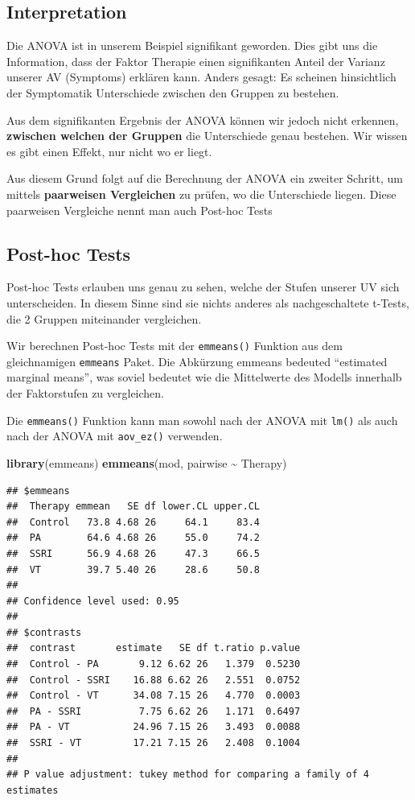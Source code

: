 \documentclass[
]{book}
\newenvironment{Shaded}{\begin{snugshade}}{\end{snugshade}}
\newcommand{\FunctionTok}[1]{\textcolor[rgb]{0.13,0.29,0.53}{\textbf{#1}}}
\newcommand{\NormalTok}[1]{#1}
\newcommand{\SpecialCharTok}[1]{\textcolor[rgb]{0.81,0.36,0.00}{\textbf{#1}}}
\begin{document}
\subsection{Interpretation}\label{interpretation}

Die ANOVA ist in unserem Beispiel signifikant geworden. Dies gibt uns die Information, dass der Faktor Therapie einen signifikanten Anteil der Varianz unserer AV (Symptoms) erklären kann. Anders gesagt: Es scheinen hinsichtlich der Symptomatik Unterschiede zwischen den Gruppen zu bestehen.

Aus dem signifikanten Ergebnis der ANOVA können wir jedoch nicht erkennen, \textbf{zwischen welchen der Gruppen} die Unterschiede genau bestehen. Wir wissen es gibt einen Effekt, nur nicht wo er liegt.

Aus diesem Grund folgt auf die Berechnung der ANOVA ein zweiter Schritt, um mittels \textbf{paarweisen Vergleichen} zu prüfen, wo die Unterschiede liegen. Diese paarweisen Vergleiche nennt man auch Post-hoc Tests

\subsection{Post-hoc Tests}\label{post-hoc-tests}

Post-hoc Tests erlauben uns genau zu sehen, welche der Stufen unserer UV sich unterscheiden. In diesem Sinne sind sie nichts anderes als nachgeschaltete t-Tests, die 2 Gruppen miteinander vergleichen.

Wir berechnen Post-hoc Tests mit der \texttt{emmeans()} Funktion aus dem gleichnamigen \texttt{emmeans} Paket. Die Abkürzung emmeans bedeuted ``estimated marginal means'', was soviel bedeutet wie die Mittelwerte des Modells innerhalb der Faktorstufen zu vergleichen.

Die \texttt{emmeans()} Funktion kann man sowohl nach der ANOVA mit \texttt{lm()} als auch nach der ANOVA mit \texttt{aov\_ez()} verwenden.

\begin{Shaded}
\begin{Highlighting}[]
\FunctionTok{library}\NormalTok{(emmeans)}
\FunctionTok{emmeans}\NormalTok{(mod, pairwise }\SpecialCharTok{\textasciitilde{}}\NormalTok{ Therapy)}
\end{Highlighting}
\end{Shaded}

\begin{verbatim}
## $emmeans
##  Therapy emmean   SE df lower.CL upper.CL
##  Control   73.8 4.68 26     64.1     83.4
##  PA        64.6 4.68 26     55.0     74.2
##  SSRI      56.9 4.68 26     47.3     66.5
##  VT        39.7 5.40 26     28.6     50.8
## 
## Confidence level used: 0.95 
## 
## $contrasts
##  contrast       estimate   SE df t.ratio p.value
##  Control - PA       9.12 6.62 26   1.379  0.5230
##  Control - SSRI    16.88 6.62 26   2.551  0.0752
##  Control - VT      34.08 7.15 26   4.770  0.0003
##  PA - SSRI          7.75 6.62 26   1.171  0.6497
##  PA - VT           24.96 7.15 26   3.493  0.0088
##  SSRI - VT         17.21 7.15 26   2.408  0.1004
## 
## P value adjustment: tukey method for comparing a family of 4 estimates
\end{verbatim}
\end{document}
